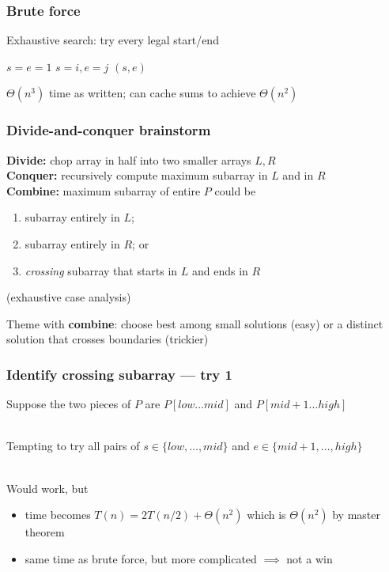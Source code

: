 \documentclass{beamer}
\newcommand{\stanza}{ \\~\ }
\begin{document}
\begin{frame} \frametitle{Brute force}
  Exhaustive search: try every legal start/end

  \begin{algorithmic}[1]
    \State $s = e = 1$
          \State $s=i, e=j$
        \EndIf
      \EndFor
    \EndFor
    \State \Return $(s, e)$
    \EndFunction
  \end{algorithmic}

  $\Theta(n^3)$ time as written; can cache sums to achieve
  $\Theta(n^2)$

\end{frame}

\begin{frame} \frametitle{Divide-and-conquer brainstorm}
\textbf{Divide:} chop array in half into two smaller arrays $L, R$\\
\textbf{Conquer:} recursively compute maximum subarray in $L$ and in $R$ \\
\textbf{Combine:} maximum subarray of entire $P$ could be
\begin{enumerate}
  \item subarray entirely in $L$;
  \item subarray entirely in $R$; or
  \item \emph{crossing} subarray that starts in $L$ and ends in $R$
\end{enumerate}
(exhaustive case analysis)

Theme with \textbf{combine}: choose best among small solutions (easy) or
a distinct solution that crosses boundaries (trickier)
\end{frame}

\begin{frame} \frametitle{Identify crossing subarray --- try 1}
Suppose the two pieces of $P$ are $P[low \ldots mid]$ and
  $P[mid+1 \ldots high]$ \stanza

Tempting to try all pairs of $s \in \{low, \ldots, mid \}$ and
$e \in \{mid+1, \ldots, high\}$ \stanza

Would work, but
\begin{itemize}
  \item time becomes $T(n) = 2 T(n/2) + \Theta(n^2)$ which is $\Theta(n^2)$
    by master theorem
  \item same time as brute force, but more complicated $\implies$ not a win
\end{itemize}
\end{frame}
\end{document}
